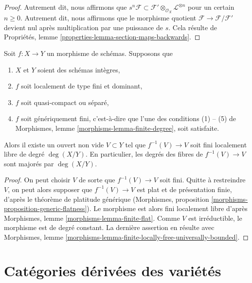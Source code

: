 \begin{proof}
Autrement dit, nous affirmons que
$s^n\mathcal{F} \subset
\mathcal{F}' \otimes_{\mathcal{O}_X} \mathcal{L}^{\otimes n}$
pour un certain $n \geq 0$. Autrement dit, nous affirmons que le morphisme
quotient $\mathcal{F} \to \mathcal{F}/\mathcal{F}'$ devient
nul après multiplication par une puissance de $s$.
Cela résulte de Propriétés, lemme
\ref{properties-lemma-section-maps-backwards}.
\end{proof}

\begin{lemma}
\label{lemma-bound-degree-in-nbhd-generic-point}
Soit $f : X \to Y$ un morphisme de schémas. Supposons que
\begin{enumerate}
\item $X$ et $Y$ soient des schémas intègres,
\item $f$ soit localement de type fini et dominant,
\item $f$ soit quasi-compact ou séparé,
\item $f$ soit génériquement fini, c'est-à-dire que l'une des conditions
(1) -- (5) de Morphismes, lemme \ref{morphisms-lemma-finite-degree}, soit satisfaite.
\end{enumerate}
Alors il existe un ouvert non vide $V \subset Y$ tel que
$f^{-1}(V) \to V$ soit fini localement libre de degré $\deg(X/Y)$.
En particulier, les degrés des fibres de $f^{-1}(V) \to V$
sont majorés par $\deg(X/Y)$.
\end{lemma}

\begin{proof}
On peut choisir $V$ de sorte que $f^{-1}(V) \to V$ soit fini.
Quitte à restreindre $V$, on peut alors supposer que $f^{-1}(V) \to V$
est plat et de présentation finie, d'après le théorème de platitude générique
(Morphismes, proposition \ref{morphisms-proposition-generic-flatness}).
Le morphisme est alors fini localement libre d'après
Morphismes, lemme \ref{morphisms-lemma-finite-flat}.
Comme $V$ est irréductible, le morphisme est de degré constant.
La dernière assertion en résulte avec
Morphismes, lemme \ref{morphisms-lemma-finite-locally-free-universally-bounded}.
\end{proof}





\section{Catégories dérivées des variétés}
\label{section-equiv}

